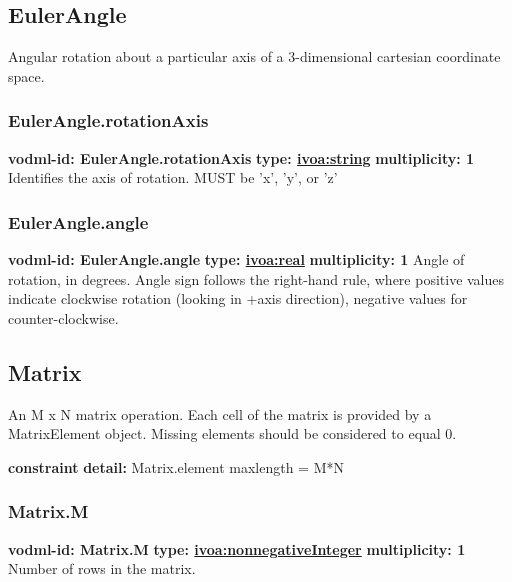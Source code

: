   \subsection{EulerAngle}
  \label{sect:EulerAngle}
    Angular rotation about a particular axis of a 3-dimensional cartesian coordinate space.

    \subsubsection{EulerAngle.rotationAxis}
      \textbf{vodml-id: EulerAngle.rotationAxis} \newline
      \textbf{type: \hyperref[sect:ivoa]{ivoa:string}} \newline
      \textbf{multiplicity: 1} \newline 
      Identifies the axis of rotation. MUST be 'x', 'y', or 'z'

    \subsubsection{EulerAngle.angle}
      \textbf{vodml-id: EulerAngle.angle} \newline
      \textbf{type: \hyperref[sect:ivoa]{ivoa:real}} \newline
      \textbf{multiplicity: 1} \newline 
      Angle of rotation, in degrees. Angle sign follows the right-hand rule, where positive values indicate clockwise rotation (looking in +axis direction), negative values for counter-clockwise.

  \subsection{Matrix}
  \label{sect:Matrix}
    An M x N matrix operation. Each cell of the matrix is provided by a MatrixElement object. Missing elements should be considered to equal 0.

    \noindent \textbf{constraint} \newline
    \indent    \textbf{detail:} Matrix.element maxlength = M*N \newline


    \subsubsection{Matrix.M}
      \textbf{vodml-id: Matrix.M} \newline
      \textbf{type: \hyperref[sect:ivoa]{ivoa:nonnegativeInteger}} \newline
      \textbf{multiplicity: 1} \newline 
      Number of rows in the matrix.

